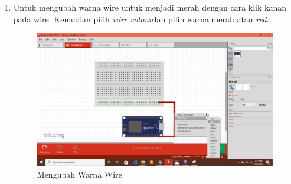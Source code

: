 \begin{enumerate}
    \item Untuk mengubah warna wire untuk menjadi merah dengan cara klik kanan pada wire. Kemudian pilih \textit{wire colour}dan pilih warna merah atau \textit{red.}
    \begin{figure}[H]
    \centering
    \includegraphics[width=1.1\textwidth]{figures/tutor5.png}
    \caption{Mengubah Warna Wire }
    \label{print}
    \end{figure}
    

\end{enumerate}
